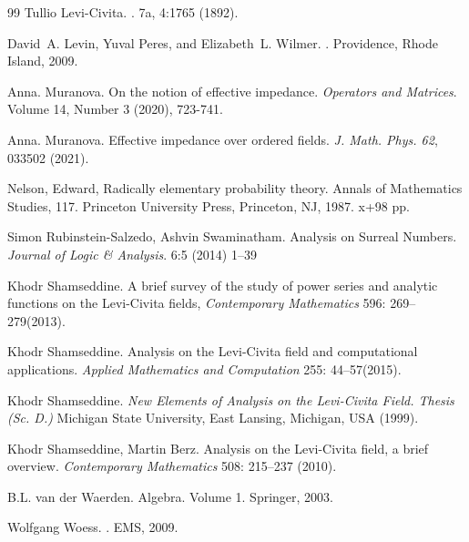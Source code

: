 \documentclass[a4paper,12pt]{amsart}
\theoremstyle{definition}
\begin{document}
\begin{thebibliography}{99}
Tullio Levi-Civita. 
.
7a, 4:1765  (1892).

 David~A. Levin, Yuval Peres, and Elizabeth~L. Wilmer.
.
\newblock Providence, Rhode Island, 2009.
 
 Anna. Muranova.  On the notion of effective impedance. \emph{Operators and Matrices}. Volume 14, Number 3 (2020), 723-741.

 Anna. Muranova.  Effective impedance over ordered fields. \emph{J. Math. Phys. 62}, 033502 (2021).


 Nelson, Edward,
Radically elementary probability theory.
Annals of Mathematics Studies, 117. Princeton University Press, Princeton, NJ, 1987. x+98 pp.

 Simon Rubinstein-Salzedo, Ashvin Swaminatham. Analysis on Surreal Numbers. \emph{Journal of Logic \& Analysis}.  6:5 (2014) 1–39


Khodr Shamseddine. {A brief survey of the study of power series and analytic functions on the {Levi}-{Civita} fields}, \emph{Contemporary Mathematics} 596: 269--279(2013).

Khodr Shamseddine. {Analysis on the Levi-Civita field and computational applications}. \emph{Applied Mathematics and Computation} 255: 44--57(2015).

Khodr Shamseddine. {\em New Elements of Analysis on the Levi-Civita Field. Thesis (Sc. D.)} Michigan State University, East Lansing, Michigan, USA (1999).

Khodr Shamseddine, Martin Berz.
Analysis on the {L}evi-{C}ivita field, a brief overview. \emph{Contemporary Mathematics} 508: 215--237 (2010).

B.L. van der Waerden. Algebra. Volume 1. Springer, 2003.

 Wolfgang Woess. 
.
\newblock EMS, 2009.
    \end{thebibliography}
\end{document}
